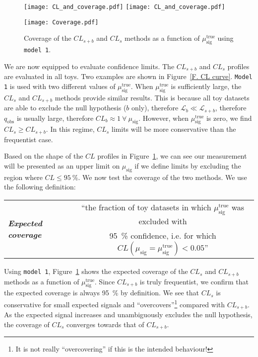 \begin{figure}[!]
\centering
\texttt{[image: CL\_and\_coverage.pdf]}
\texttt{[image: CL\_and\_coverage.pdf]}
\caption{$CL_{s+b}$ and $CL_s$ curves evaluated using individual toys generated under two different $\mu_\text{sig}^\text{true}$ hypotheses using \texttt{model 1}. The toy with median $q_\text{obs}$ is shown.}
\label{F. CL curve}
\vspace{1cm}
\texttt{[image: Coverage.pdf]}
\caption{Coverage of the $CL_{s+b}$ and $CL_s$ methods as a function of $\mu_\text{sig}^\text{true}$ using \texttt{model 1}.}
\label{F. Coverage}
\end{figure}

We are now equipped to evaluate confidence limits. The $CL_{s+b}$ and $CL_s$ profiles are evaluated in all toys. Two examples are shown in Figure~\ref{F. CL curve}. \texttt{Model 1} is used with two different values of $\mu_\text{sig}^\text{true}$. When $\mu_\text{sig}^\text{true}$ is sufficiently large, the $CL_s$ and $CL_{s+b}$ methods provide similar results. This is because all toy datasets are able to exclude the null hypothesis ($b$ only), therefore $\mathcal{L}_b \ll \mathcal{L}_{s+b}$, therefore $q_\text{obs}$ is usually large, therefore $CL_b\approx1~\forall~\mu_\text{sig}$. However, when $\mu_\text{sig}^\text{true}$ is zero, we find $CL_s \geq CL_{s+b}$. In this regime, $CL_s$ limits will be more conservative than the frequentist case.

Based on the shape of the $CL$ profiles in Figure~\ref{F. Coverage}, we can see our measurement will be presented as an upper limit on $\mu_\text{sig}$ if we define limits by excluding the region where $CL\leq95~\%$. We now test the coverage of the two methods. We use the following definition:

 \begin{table}[h!]
 \begin{tabular}{lc}
\multirow{2}{*}{\textbf{\emph{Expected coverage}}} \hspace{0.5cm}  & ``the fraction of toy datasets in which $\mu_\text{sig}^\text{true}$ was excluded with \\
& 95~\% confidence, i.e. for which $CL\left(\mu_\text{sig}=\mu_\text{sig}^\text{true}\right)<0.05$''
\end{tabular}
\end{table}

Using \texttt{model 1}, Figure~\ref{F. Coverage} shows the expected coverage of the $CL_s$ and $CL_{s+b}$ methods as a function of $\mu_\text{sig}^\text{true}$. Since $CL_{s+b}$ is truly frequentist, we confirm that the expected coverage is always 95~\% by definition. We see that $CL_s$ is conservative for small expected signals and ``overcovers''\footnote{It is not really ``overcovering'' if this is the intended behaviour!} compared with $CL_{s+b}$. As the expected signal increases and unambiguously excludes the null hypothesis, the coverage of $CL_s$ converges towards that of $CL_{s+b}$.








